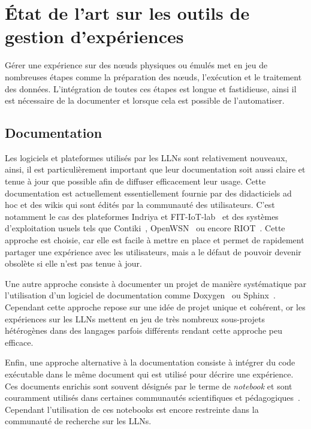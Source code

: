 \section{État de l'art sur les outils de gestion d'expériences}
\label{makesense:related}

Gérer une expérience sur des nœuds physiques ou émulés met en jeu de nombreuses étapes comme la préparation des nœuds, l'exécution et le traitement des données.
L'intégration de toutes ces étapes est longue et fastidieuse, ainsi il est nécessaire de la documenter et lorsque cela est possible de l'automatiser. 

\subsection{Documentation}

Les logiciels et plateformes utilisés par les \ac{LLN}s sont relativement nouveaux, ainsi, il est particulièrement important que leur documentation soit aussi claire et tenue à jour que possible afin de diffuser efficacement leur usage.
Cette documentation est actuellement essentiellement fournie par des didacticiels ad hoc et des wikis qui sont édités par la communauté des utilisateurs.
C'est notamment le cas des plateformes Indriya et FIT-IoT-lab~\cite{fleury2015fit,doddavenkatappa2011indriya} et des systèmes d'exploitation usuels tels que Contiki~\cite{dunkels2004contiki}, OpenWSN~\cite{watteyne2012openwsn} ou encore RIOT~\cite{baccelli2013riot}.
Cette approche est choisie, car elle est facile à mettre en place et permet de rapidement partager une expérience avec les utilisateurs, mais a le défaut de pouvoir devenir obsolète si elle n'est pas tenue à jour.

Une autre approche consiste à documenter un projet de manière systématique par l'utilisation d'un logiciel de documentation comme Doxygen~\cite{van2004doxygen} ou Sphinx~\cite{brandl2010sphinx}.
Cependant cette approche repose sur une idée de projet unique et cohérent, or les expériences sur les \ac{LLN}s mettent en jeu de très nombreux sous-projets hétérogènes dans des langages parfois différents rendant cette approche peu efficace.

Enfin, une approche alternative à la documentation consiste à intégrer du code exécutable dans le même document qui est utilisé pour décrire une expérience.
Ces documents enrichis sont souvent désignés par le terme de \emph{notebook} et sont couramment utilisés dans certaines communautés scientifiques et pédagogiques~\cite{young2003science,shen2014interactive}.
Cependant l'utilisation de ces notebooks est encore restreinte dans la communauté de recherche sur les \ac{LLN}s.

